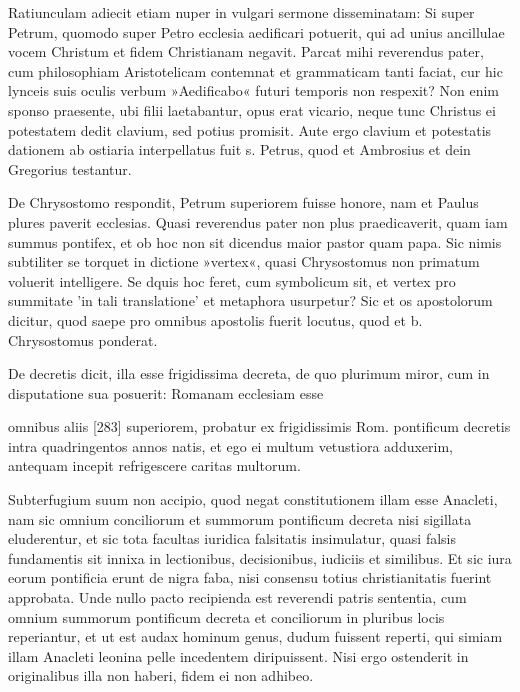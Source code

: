 Ratiunculam adiecit etiam nuper in vulgari sermone disseminatam: Si super Petrum, quomodo super Petro ecclesia aedificari potuerit, qui ad unius ancillulae vocem Christum et fidem Christianam negavit. Parcat mihi reverendus pater, cum philosophiam Aristotelicam contemnat et grammaticam tanti faciat, cur hic lynceis suis oculis verbum »Aedificabo« futuri temporis non respexit? Non enim sponso praesente, ubi filii laetabantur, opus erat vicario, neque tunc Christus ei potestatem dedit clavium, sed potius promisit. Aute ergo clavium et potestatis dationem ab ostiaria interpellatus fuit s. Petrus, quod et Ambrosius et dein Gregorius testantur.

De Chrysostomo respondit, Petrum superiorem fuisse honore, nam et Paulus plures paverit ecclesias. Quasi reverendus pater non plus praedicaverit, quam iam summus pontifex, et ob hoc non sit dicendus maior pastor quam papa. Sic nimis subtiliter se torquet in dictione »vertex«, quasi Chrysostomus non primatum voluerit intelligere. Se dquis hoc feret, cum symbolicum sit, et vertex pro summitate 'in tali translatione' et metaphora usurpetur? Sic et os apostolorum dicitur, quod saepe pro omnibus apostolis fuerit locutus, quod et b. Chrysostomus ponderat.

De decretis dicit, illa esse frigidissima decreta, de quo plurimum miror, cum in disputatione sua posuerit: Romanam ecclesiam esse

omnibus aliis [283] superiorem, probatur ex frigidissimis Rom. pontificum decretis intra quadringentos annos natis, et ego ei multum vetustiora adduxerim, antequam incepit refrigescere caritas multorum.

Subterfugium suum non accipio, quod negat constitutionem illam esse Anacleti, nam sic omnium conciliorum et summorum pontificum decreta nisi sigillata eluderentur, et sic tota facultas iuridica falsitatis insimulatur, quasi falsis fundamentis sit innixa in lectionibus, decisionibus, iudiciis et similibus. Et sic iura eorum pontificia erunt de nigra faba, nisi consensu totius christianitatis fuerint approbata. Unde nullo pacto recipienda est reverendi patris sententia, cum omnium summorum pontificum decreta et conciliorum in pluribus locis reperiantur, et ut est audax hominum genus, dudum fuissent reperti, qui simiam illam Anacleti leonina pelle incedentem diripuissent. Nisi ergo ostenderit in originalibus illa non haberi, fidem ei non adhibeo.

